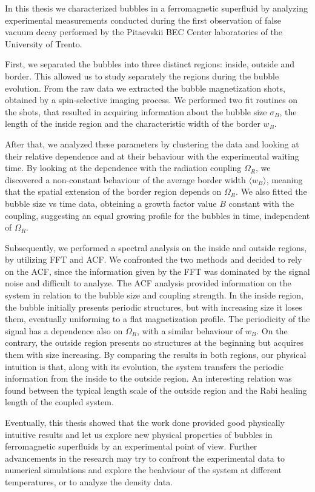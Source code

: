 In this thesis we characterized bubbles in a ferromagnetic superfluid by analyzing experimental measurements conducted during the first observation of false vacuum decay performed by the Pitaevskii BEC Center laboratories of the University of Trento. 

First, we separated the bubbles into three distinct regions: inside, outside and border. This allowed us to study separately the regions during the bubble evolution. From the raw data we extracted the bubble magnetization shots, obtained by a spin-selective imaging process. We performed two fit routines on the shots, that resulted in acquiring information about the bubble size $\sigma_B$, the length of the inside region and the characteristic width of the border $w_B$. 

After that, we analyzed these parameters by clustering the data and looking at their relative dependence and at their behaviour with the experimental waiting time. By looking at the dependence with the radiation coupling $\Omega_R$, we discovered a non-constant behaviour of the average border width $\langle w_B\rangle$, meaning that the spatial extension of the border region depends on $\Omega_R$. We also fitted the bubble size vs time data, obteining a growth factor value $B$ constant with the coupling, suggesting an equal growing profile for the bubbles in time, independent of $\Omega_R$.

Subsequently, we performed a spectral analysis on the inside and outside regions, by utilizing FFT and ACF. We confronted the two methods and decided to rely on the ACF, since the information given by the FFT was dominated by the signal noise and difficult to analyze. The ACF analysis provided information on the system in relation to the bubble size and coupling strength. In the inside region, the bubble initially presents periodic structures, but with increasing size it loses them, eventually uniforming to a flat magnetization profile. The periodicity of the signal has a dependence also on $\Omega_R$, with a similar behaviour of $w_B$. On the contrary, the outside region presents no structures at the beginning but acquires them with size increasing. By comparing the results in both regions, our physical intuition is that, along with its evolution, the system transfers the periodic information from the inside to the outside region. An interesting relation was found between the typical length scale of the outside region and the Rabi healing length of the coupled system.

Eventually, this thesis showed that the work done provided good physically intuitive results and let us explore new physical properties of bubbles in ferromagnetic superfluids by an experimental point of view. Further advancements in the research may try to confront the experimental data to numerical simulations and explore the beahviour of the system at different temperatures, or to analyze the density data.
